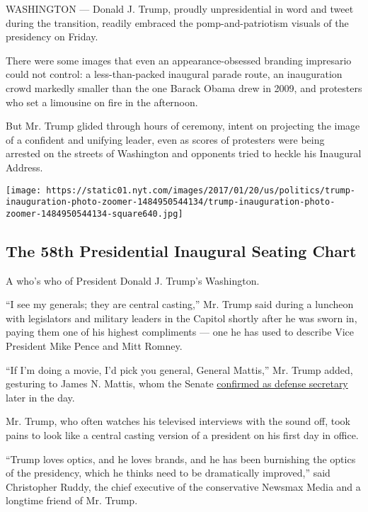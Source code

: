 WASHINGTON --- Donald J. Trump, proudly unpresidential in word and tweet
during the transition, readily embraced the pomp-and-patriotism visuals
of the presidency on Friday.

There were some images that even an appearance-obsessed branding
impresario could not control: a less-than-packed inaugural parade route,
an inauguration crowd markedly smaller than the one Barack Obama drew in
2009, and protesters who set a limousine on fire in the afternoon.

But Mr. Trump glided through hours of ceremony, intent on projecting the
image of a confident and unifying leader, even as scores of protesters
were being arrested on the streets of Washington and opponents tried to
heckle his Inaugural Address.

\href{https://www.nytimes.com/interactive/2017/01/20/us/politics/trump-inauguration-photo-zoomer.html}{}

\texttt{[image: https://static01.nyt.com/images/2017/01/20/us/politics/trump-inauguration-photo-zoomer-1484950544134/trump-inauguration-photo-zoomer-1484950544134-square640.jpg]}

\hypertarget{the-58th-presidential-inaugural-seating-chart}{%
\subsection{The 58th Presidential Inaugural Seating
Chart}\label{the-58th-presidential-inaugural-seating-chart}}

A who's who of President Donald J. Trump's Washington.

``I see my generals; they are central casting,'' Mr. Trump said during a
luncheon with legislators and military leaders in the Capitol shortly
after he was sworn in, paying them one of his highest compliments ---
one he has used to describe Vice President Mike Pence and Mitt Romney.

``If I'm doing a movie, I'd pick you general, General Mattis,'' Mr.
Trump added, gesturing to James N. Mattis, whom the Senate
\href{https://www.nytimes.com/2017/01/20/us/politics/trump-cabinet-confirmation-mattis-kelly.html}{confirmed
as defense secretary} later in the day.

Mr. Trump, who often watches his televised interviews with the sound
off, took pains to look like a central casting version of a president on
his first day in office.

``Trump loves optics, and he loves brands, and he has been burnishing
the optics of the presidency, which he thinks need to be dramatically
improved,'' said Christopher Ruddy, the chief executive of the
conservative Newsmax Media and a longtime friend of Mr. Trump.

